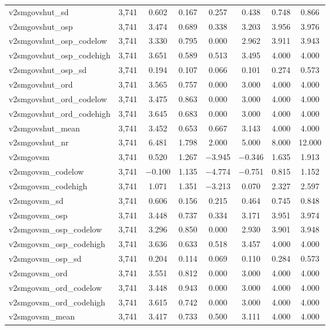 \begin{table}[!htbp]
\begin{tabular}{@{\extracolsep{5pt}}lccccccc}
v2smgovshut\_sd & 3,741 & 0.602 & 0.167 & 0.257 & 0.438 & 0.748 & 0.866 \\ 
v2smgovshut\_osp & 3,741 & 3.474 & 0.689 & 0.338 & 3.203 & 3.956 & 3.976 \\ 
v2smgovshut\_osp\_codelow & 3,741 & 3.330 & 0.795 & 0.000 & 2.962 & 3.911 & 3.943 \\ 
v2smgovshut\_osp\_codehigh & 3,741 & 3.651 & 0.589 & 0.513 & 3.495 & 4.000 & 4.000 \\ 
v2smgovshut\_osp\_sd & 3,741 & 0.194 & 0.107 & 0.066 & 0.101 & 0.274 & 0.573 \\ 
v2smgovshut\_ord & 3,741 & 3.565 & 0.757 & 0.000 & 3.000 & 4.000 & 4.000 \\ 
v2smgovshut\_ord\_codelow & 3,741 & 3.475 & 0.863 & 0.000 & 3.000 & 4.000 & 4.000 \\ 
v2smgovshut\_ord\_codehigh & 3,741 & 3.645 & 0.683 & 0.000 & 3.000 & 4.000 & 4.000 \\ 
v2smgovshut\_mean & 3,741 & 3.452 & 0.653 & 0.667 & 3.143 & 4.000 & 4.000 \\ 
v2smgovshut\_nr & 3,741 & 6.481 & 1.798 & 2.000 & 5.000 & 8.000 & 12.000 \\ 
v2smgovsm & 3,741 & 0.520 & 1.267 & $-$3.945 & $-$0.346 & 1.635 & 1.913 \\ 
v2smgovsm\_codelow & 3,741 & $-$0.100 & 1.135 & $-$4.774 & $-$0.751 & 0.815 & 1.152 \\ 
v2smgovsm\_codehigh & 3,741 & 1.071 & 1.351 & $-$3.213 & 0.070 & 2.327 & 2.597 \\ 
v2smgovsm\_sd & 3,741 & 0.606 & 0.156 & 0.215 & 0.464 & 0.745 & 0.848 \\ 
v2smgovsm\_osp & 3,741 & 3.448 & 0.737 & 0.334 & 3.171 & 3.951 & 3.974 \\ 
v2smgovsm\_osp\_codelow & 3,741 & 3.296 & 0.850 & 0.000 & 2.930 & 3.901 & 3.948 \\ 
v2smgovsm\_osp\_codehigh & 3,741 & 3.636 & 0.633 & 0.518 & 3.457 & 4.000 & 4.000 \\ 
v2smgovsm\_osp\_sd & 3,741 & 0.204 & 0.114 & 0.069 & 0.110 & 0.284 & 0.573 \\ 
v2smgovsm\_ord & 3,741 & 3.551 & 0.812 & 0.000 & 3.000 & 4.000 & 4.000 \\ 
v2smgovsm\_ord\_codelow & 3,741 & 3.448 & 0.943 & 0.000 & 3.000 & 4.000 & 4.000 \\ 
v2smgovsm\_ord\_codehigh & 3,741 & 3.615 & 0.742 & 0.000 & 3.000 & 4.000 & 4.000 \\ 
v2smgovsm\_mean & 3,741 & 3.417 & 0.733 & 0.500 & 3.111 & 4.000 & 4.000 \\ 

\end{tabular}
\end{table}
